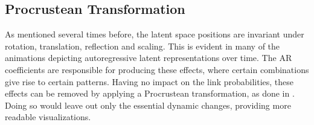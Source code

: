 \subsection{Procrustean Transformation}

    As mentioned several times before, the latent space positions are invariant under rotation, translation, reflection and scaling. This is evident in many of the animations depicting autoregressive latent representations over time. The AR coefficients are responsible for producing these effects, where certain combinations give rise to certain patterns.
    Having no impact on the link probabilities, these effects can be removed by applying a Procrustean transformation, as done in \cite{hoff2002latent}. Doing so would leave out only the essential dynamic changes, providing more readable visualizations.

